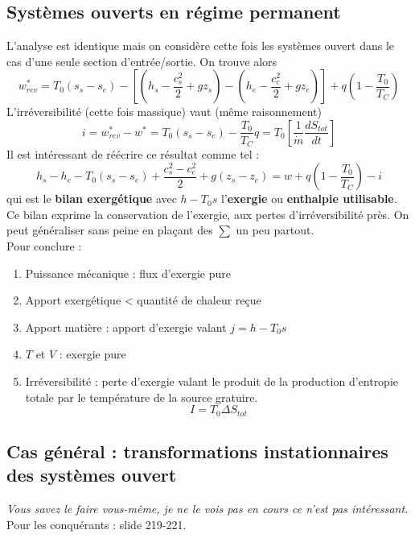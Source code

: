 		\subsection{Systèmes ouverts en régime permanent}
		L'analyse est identique mais on considère cette fois les systèmes ouvert 
		dans le cas d'une seule section d'entrée/sortie. On trouve alors
		\begin{equation}
		w_{rev}^* = T_0(s_s-s_e) - \left[\left(h_s-\dfrac{c_s^2}{2}+gz_s\right)-
		\left(h_e-\dfrac{c_e^2}{2}+gz_e\right)\right] + q\left(1-\dfrac{T_0}{T_C}\right)
		\label{eq:TravIrr}
		\end{equation}
		L'irréversibilité (cette fois massique) vaut (même raisonnement) 
		\begin{equation}
		i = w_{rev}^* - w^* = T_0(s_s-s_e) - \dfrac{T_0}{T_C}q = T_0\left[\dfrac{1}{
		\dot{m}}\dfrac{dS_{tot}}{dt}\right]
		\end{equation}
		Il est intéressant de réécrire ce résultat comme tel :
		\begin{equation}
		h_s-h_e - T_0(s_s-s_e) + \dfrac{c_s^2-c_e^2}{2}+g(z_s-z_e) = w + q\left(
		1-\dfrac{T_0}{T_C}\right) - i
		\end{equation}
		qui est le \textbf{bilan exergétique} avec $h-T_0s$ l'\textbf{exergie} ou 
		\textbf{enthalpie utilisable}. Ce bilan exprime la conservation de l'exergie, 
		aux pertes d'irréversibilité près. On peut généraliser sans peine en plaçant 
		des $\sum$ un peu partout.\\
		Pour conclure :
		\begin{enumerate}
		\item Puissance mécanique : flux d'exergie pure
		\item Apport exergétique < quantité de chaleur reçue
		\item Apport matière : apport d'exergie valant $j = h-T_0s$
		\item $T$ et $V$ : exergie pure
		\item Irréversibilité : perte d'exergie valant le produit de la production 
		d'entropie totale par le température de la source gratuire.
		\begin{equation}
		I = T_0\Delta S_{tot}
		\end{equation}
		\end{enumerate}
		
		\subsection{Cas général : transformations instationnaires des systèmes ouvert}
		\textit{Vous savez le faire vous-même, je ne le vois pas en cours ce n'est 
		pas intéressant.} Pour les conquérants : slide 219-221.
		
